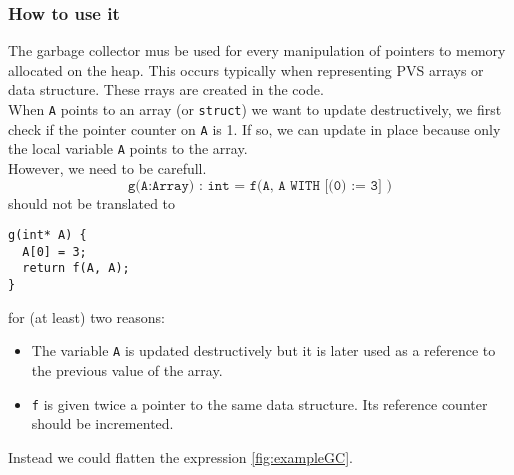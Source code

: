 \documentclass[12pt,a4paper]{article}
\newcommand{\cl}[1]{\texttt{#1}}
\begin{document}
\subsubsection{How to use it}

The garbage collector mus be used for every manipulation of pointers to memory allocated on the heap. This occurs typically when representing PVS arrays or data structure. These rrays are created in the code.\\

%


When \cl{A} points to an array (or \cl{struct}) we want to update destructively, we first check if the pointer counter on \cl{A} is 1. If so, we can update in place because only the local variable \cl{A} points to the array.\\

However, we need to be carefull.
$$ \cl{g(A:Array) : int = f(A, A WITH [(0) := 3] )}$$
should not be translated to
\begin{lstlisting}
g(int* A) {
  A[0] = 3;
  return f(A, A);
}
\end{lstlisting}
for (at least) two reasons:
\begin{itemize}
\item The variable \cl{A} is updated destructively but it is later used as a reference to the previous value of the array.
\item \cl{f} is given twice a pointer to the same data structure. Its reference counter should be incremented.
\end{itemize}

Instead we could flatten the expression \ref{fig:exampleGC}.
\end{document}
